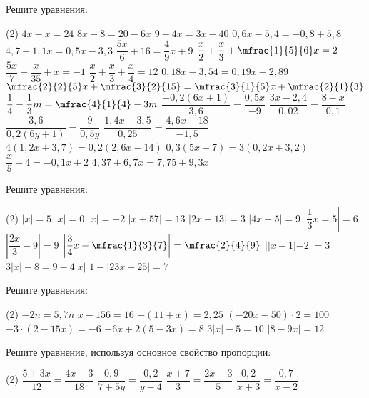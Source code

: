 \begin{class}[number=5]
	\begin{listofex}
		\item Решите уравнения: %
		\begin{tasks}(2)
			\task \( 4x-x=24 \)
			\task \( 8x-8=20-6x \)
			\task \( 9-4x=3x-40 \)
			\task \( 0,6x-5,4=-0,8+5,8 \)
			\task \( 4,7-1,1x=0,5x-3,3 \)
			\task \( \dfrac{5x}{6}+16=\dfrac{4}{9}x+9 \)
			\task \( \dfrac{x}{2}+\dfrac{x}{3}+\mfrac{1}{5}{6}x=2 \)
			\task \( \dfrac{5x}{7}+\dfrac{x}{35}+x=-1 \)
			\task \( \dfrac{x}{2}+\dfrac{x}{3}+\dfrac{x}{4}=12 \)
			\task \( 0,18x-3,54=0,19x-2,89 \)
			\task \( \mfrac{2}{2}{5}x+ \mfrac{3}{2}{15}=\mfrac{3}{1}{5}x + \mfrac{2}{1}{3} \)
			\task \( \dfrac{1}{4} - \dfrac{1}{3}m=\mfrac{4}{1}{4}-3m \)
			\task \( \dfrac{-0,2(6x+1)}{3,6}=\dfrac{0,5x}{-9} \)
			\task \( \dfrac{3x-2,4}{0,02}=\dfrac{8-x}{0,1} \)
			\task \( \dfrac{3,6}{0,2(6y+1)}=\dfrac{9}{0,5y} \)
			\task \( \dfrac{1,4x-3,5}{0,25}=\dfrac{4,6x-18}{-1,5} \)
			\task \( 4(1,2x+3,7)=0,2(2,6x-14) \)
			\task \( 0,3(5x-7)=3(0,2x+3,2) \)
			\task \( \dfrac{x}{5}-4=-0,1x+2 \)
			\task \( 4,37+6,7x=7,75+9,3x \)
		\end{tasks}
		\item Решите уравнения: %
		\begin{tasks}(2)
			\task \( |x|=5 \)
			\task \( |x|=0 \)
			\task \( |x|=-2 \)
			\task \( |x+57|=13 \)
			\task \( |2x-13|=3 \)
			\task \( |4x-5|=9 \)
			\task \( \left| \dfrac{1}{3}x=5 \right|=6 \)
			\task \( \left| \dfrac{2x}{3}-9 \right|=9 \)
			\task \( \left| \dfrac{3}{4}x-\mfrac{1}{3}{7} \right|=\mfrac{2}{4}{9} \)
			\task \( ||x-1|-2|=3 \)
			\task \( 3|x|-8=9-4|x| \)
			\task \( 1-|23x-25|=7 \)
		\end{tasks}
		
	\end{listofex}
\end{class}

\begin{homework}[number=1]
	\begin{listofex}
		\item Решите уравнения: %
		\begin{tasks}(2)
			\task \( -2n=5,7n \)
			\task \( x-156=16 \)
			\task \( -(11+x)=2,25 \)
			\task \( (-20x-50)\cdot 2 = 100 \)
			\task \( -3 \cdot (2-15x) = -6 \)
			\task \( -6x+2(5-3x)=8 \)
			\task \( 3|x|-5=10 \)
			\task \( |8-9x|=12 \)
		\end{tasks}
		\item Решите уравнение, используя основное свойство пропорции:
		\begin{tasks}(2)
			\task \( \dfrac{5+3x}{12} = \dfrac{4x-3}{18} \)
			\task \( \dfrac{0,9}{7+5y} = \dfrac{0,2}{y-4} \)
			\task \( \dfrac{x+7}{3} = \dfrac{2x-3}{5} \)
			\task \( \dfrac{0,2}{x+3} = \dfrac{0,7}{x-2} \)
		\end{tasks}
		
	\end{listofex}
\end{homework}



